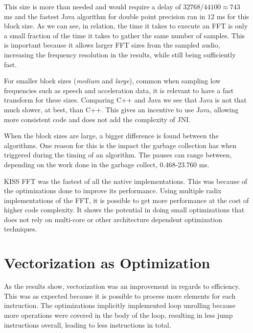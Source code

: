 This size is more than needed and would require a delay of $32768/44100\approx 743 $ ms and the fastest Java algorithm for double point precision ran in $12$ ms for this block size. As we can see, in relation, the time it takes to execute an FFT is only a small fraction of the time it takes to gather the same number of samples. This is important because it allows larger FFT sizes from the sampled audio, increasing the frequency resolution in the results, while still being sufficiently fast.


For smaller block sizes (\emph{medium} and \emph{large}), common when sampling low frequencies such as speech and acceleration data, it is relevant to have a fast transform for these sizes. Comparing C++ and Java we see that Java is not that much slower, at best, than C++. This gives an incentive to use Java, allowing more consistent code and does not add the complexity of JNI.

When the block sizes are large, a bigger difference is found between the algorithms. One reason for this is the impact the garbage collection has when triggered during the timing of an algorithm. The pauses can range between, depending on the work done in the garbage collect, 0.468-23.760 ms.


KISS FFT was the fastest of all the native implementations. This was because of the optimizations done to improve its performance. Using multiple radix implementations of the FFT, it is possible to get more performance at the cost of higher code complexity. It shows the potential in doing small optimizations that does not rely on multi-core or other architecture dependent optimization techniques.

\section{Vectorization as Optimization}

As the results show, vectorization was an improvement in regards to efficiency. This was as expected because it is possible to process more elements for each instruction. The optimizations implicitly implemented loop unrolling because more operations were covered in the body of the loop, resulting in less jump instructions overall, leading to less instructions in total.

